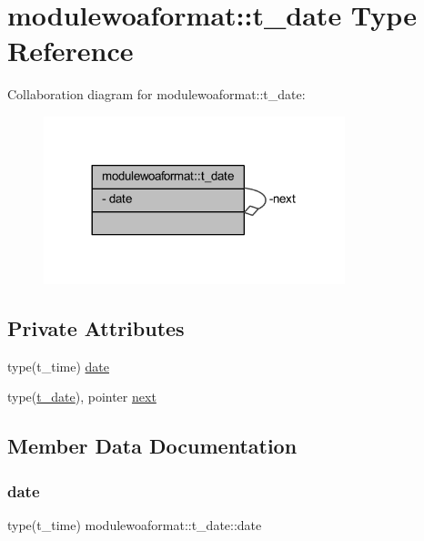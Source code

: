 \hypertarget{structmodulewoaformat_1_1t__date}{}\section{modulewoaformat\+:\+:t\+\_\+date Type Reference}
\label{structmodulewoaformat_1_1t__date}


Collaboration diagram for modulewoaformat\+:\+:t\+\_\+date\+:\nopagebreak
\begin{figure}[H]
\begin{center}
\leavevmode
\includegraphics[width=248pt]{structmodulewoaformat_1_1t__date__coll__graph}
\end{center}
\end{figure}
\subsection*{Private Attributes}
\begin{DoxyCompactItemize}
\item 
type(t\+\_\+time) \mbox{\hyperlink{structmodulewoaformat_1_1t__date_adacc29fed1928996a455941af3f8a63d}{date}}
\item 
type(\mbox{\hyperlink{structmodulewoaformat_1_1t__date}{t\+\_\+date}}), pointer \mbox{\hyperlink{structmodulewoaformat_1_1t__date_a4870285407e8ab1715ffed42d685075d}{next}}
\end{DoxyCompactItemize}


\subsection{Member Data Documentation}
\mbox{\label{structmodulewoaformat_1_1t__date_adacc29fed1928996a455941af3f8a63d}} 
\subsubsection{\texorpdfstring{date}{date}}
{\footnotesize\ttfamily type(t\+\_\+time) modulewoaformat\+::t\+\_\+date\+::date\hspace{0.3cm}{\ttfamily [private]}}

